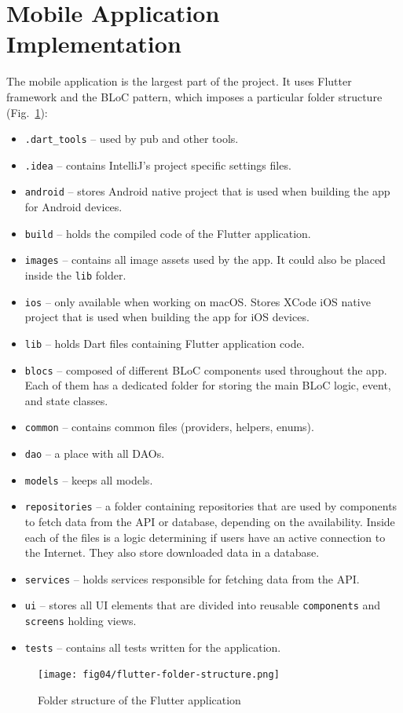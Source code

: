\section{Mobile Application Implementation}
The mobile application is the largest part of the project. It uses Flutter framework and the BLoC pattern, which imposes a particular folder structure (Fig.~\ref{fig:flutter-folder-structure}):
\begin{itemize}
    \item \texttt{.dart\_tools} -- used by pub and other tools.
    \item \texttt{.idea} -- contains IntelliJ’s project specific settings files.
    \item \texttt{android} -- stores Android native project that is used when building the app for Android devices.
    \item \texttt{build} -- holds the compiled code of the Flutter application.
    \item \texttt{images} -- contains all image assets used by the app. It could also be placed inside the \texttt{lib} folder.
    \item \texttt{ios} -- only available when working on macOS. Stores XCode iOS native project that is used when building the app for iOS devices.
    \item \texttt{lib} -- holds Dart files containing Flutter application code.
    \item \texttt{blocs} -- composed of different BLoC components used throughout the app. Each of them has a dedicated folder for storing the main BLoC logic, event, and state classes.
    \item \texttt{common} -- contains common files (providers, helpers, enums).
    \item \texttt{dao} -- a place with all DAOs.
    \item \texttt{models} -- keeps all models.
    \item \texttt{repositories} -- a folder containing repositories that are used by components to fetch data from the API or database, depending on the availability. Inside each of the files is a logic determining if users have an active connection to the Internet. They also store downloaded data in a database.
    \item \texttt{services} -- holds services responsible for fetching data from the API.
    \item \texttt{ui} -- stores all UI elements that are divided into reusable \texttt{components} and \texttt{screens} holding views.
    \item \texttt{tests} -- contains all tests written for the application.
\end{itemize}
\begin{figure}[t]
    \centering
    \texttt{[image: fig04/flutter-folder-structure.png]}
    \caption{Folder structure of the Flutter application}
    \label{fig:flutter-folder-structure}
\end{figure}

